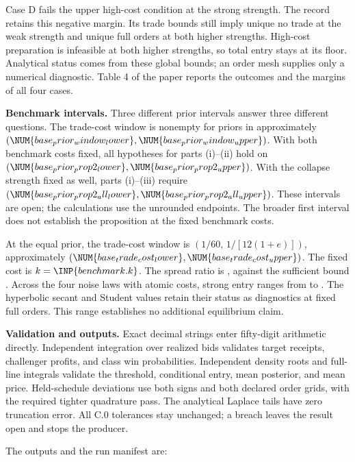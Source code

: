 Case D fails the upper high-cost condition at the strong strength. The
record retains this negative margin. Its trade bounds still imply unique
no trade at the weak strength and unique full orders at both higher
strengths. High-cost preparation is infeasible at both higher strengths,
so total entry stays at its floor. Analytical status comes from these
global bounds; an order mesh supplies only a numerical diagnostic.
Table 4 of the paper reports the outcomes and the margins of all four
cases.

\textbf{Benchmark intervals.} Three different prior intervals answer
three different questions. The trade-cost window is nonempty for priors
in approximately
\((\NUM{base_prior_window_lower},\NUM{base_prior_window_upper})\). With
both benchmark costs fixed, all hypotheses for parts (i)--(ii) hold on
\((\NUM{base_prior_prop2_lower},\NUM{base_prior_prop2_upper})\). With the
collapse strength fixed as well, parts (i)--(iii) require
\((\NUM{base_prior_prop2_all_lower},\NUM{base_prior_prop2_all_upper})\).
These intervals are open; the calculations use the unrounded endpoints.
The broader first interval does not establish the proposition at the
fixed benchmark costs.

At the equal prior, the trade-cost window is \((1/60,\,1/[12(1+e)])\),
approximately
\((\NUM{base_trade_cost_lower},\NUM{base_trade_cost_upper})\). The fixed
cost is \(k=\INP{benchmark.k}\). The spread ratio is
, against the sufficient bound
. Across the four noise laws with atomic
costs, strong entry ranges from  to
. The hyperbolic secant and Student values
retain their status as diagnostics at fixed full orders. This range
establishes no additional equilibrium claim.

\textbf{Validation and outputs.} Exact decimal strings enter fifty-digit
arithmetic directly. Independent integration over realized bids
validates target receipts, challenger profits, and class win
probabilities. Independent density roots and full-line integrals
validate the threshold, conditional entry, mean posterior, and mean
price. Held-schedule deviations use both signs and both declared order
grids, with the required tighter quadrature pass. The analytical Laplace
tails have zero truncation error. All C.0 tolerances stay unchanged; a
breach leaves the result open and stops the producer.

The outputs and the run manifest are:

\begin{Shaded}
\begin{Highlighting}[]
\end{Highlighting}
\end{Shaded}

